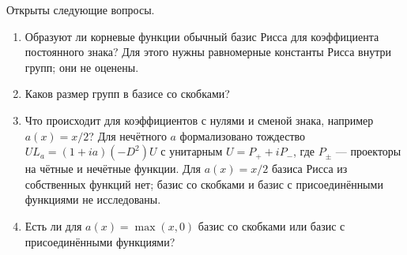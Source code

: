 \documentclass[12pt,a4paper]{article}
\begin{document}
Открыты следующие вопросы.
\begin{enumerate}
\item Образуют ли корневые функции обычный базис Рисса для коэффициента постоянного
знака? Для этого нужны равномерные константы Рисса внутри групп; они не оценены.
\item Каков размер групп в базисе со скобками?
\item Что происходит для коэффициентов с нулями и сменой знака, например $a(x)=x/2$?
Для нечётного $a$ формализовано тождество $UL_a=(1+ia)(-D^2)U$ с унитарным
$U=P_++iP_-$, где $P_\pm$ --- проекторы на чётные и нечётные функции. Для $a(x)=x/2$
базиса Рисса из собственных функций нет; базис со скобками и базис с присоединёнными
функциями не исследованы.
\item Есть ли для $a(x)=\max(x,0)$ базис со скобками или базис с присоединёнными
функциями?
\end{enumerate}
\end{document}

